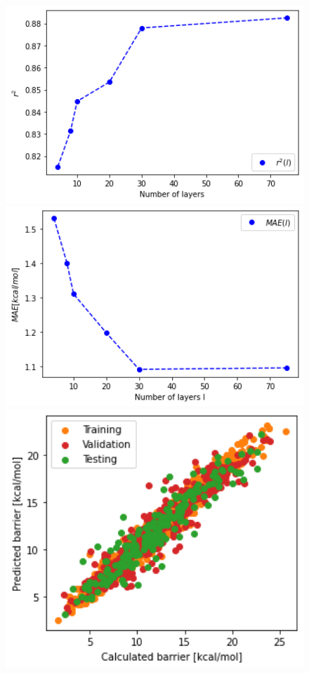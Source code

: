 \begin{figure}[!htb]
      \includegraphics[width=1.0\textwidth]{figures/regression/fourier/mae_layer.png}
    \endminipage\hfill
      \includegraphics[width=1.0\textwidth]{figures/regression/fourier/r2_layer.png}
    \endminipage\hfill
      \includegraphics[width=1.0\textwidth]{figures/regression/fourier/scatterHyperparam.png}

\end{figure}
